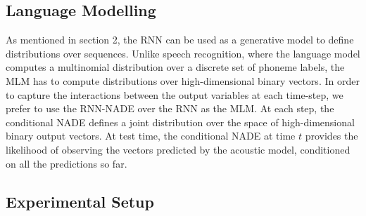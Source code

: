\documentclass{article}
\begin{document}
\subsection{Language Modelling}

As mentioned in section 2, the RNN can be used as a generative model to define distributions over sequences. Unlike speech recognition, where the language model computes a multinomial distribution over a discrete set of phoneme labels, the MLM has to compute distributions over high-dimensional binary vectors. In order to capture the interactions between the output variables at each time-step, we prefer to use the RNN-NADE over the RNN as the MLM. At each step, the conditional NADE defines a joint distribution over the space of high-dimensional binary output vectors. At test time, the conditional NADE at time $t$ provides the likelihood of observing the vectors predicted by the acoustic model, conditioned on all the predictions so far.  
\subsection{Experimental Setup}
\end{document}
